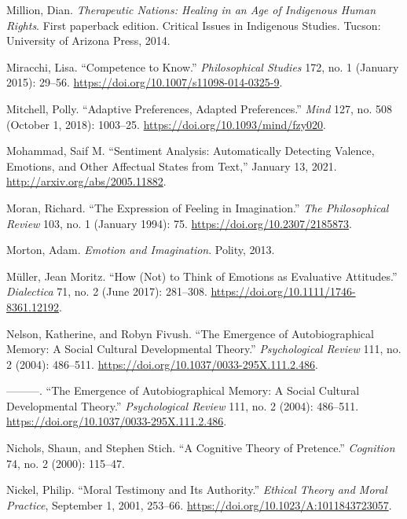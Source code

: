 \documentclass[phdthesis,12pt,final]{wuthesis}
\newlength{\cslhangindent}
\newenvironment{CSLReferences}[2] %
{\begin{list}{}{%
	\setlength{\itemindent}{0pt}
	\setlength{\leftmargin}{0pt}
	\setlength{\parsep}{0pt}
	\ifodd #1
	\setlength{\leftmargin}{\cslhangindent}
	\setlength{\itemindent}{-1\cslhangindent}
	\fi
	\setlength{\itemsep}{#2\baselineskip}}}
{\end{list}}
\theoremstyle{definition}
\theoremstyle{definition}
\theoremstyle{definition}
\theoremstyle{definition}
\theoremstyle{remark}
\begin{document}
\begin{CSLReferences}{1}{0}
Million, Dian. \emph{Therapeutic {Nations}: {Healing} in an {Age} of {Indigenous Human Rights}}. First paperback edition. Critical {Issues} in {Indigenous Studies}. Tucson: University of Arizona Press, 2014.

Miracchi, Lisa. {``Competence to Know.''} \emph{Philosophical Studies} 172, no. 1 (January 2015): 29--56. \url{https://doi.org/10.1007/s11098-014-0325-9}.

Mitchell, Polly. {``Adaptive {Preferences}, {Adapted Preferences}.''} \emph{Mind} 127, no. 508 (October 1, 2018): 1003--25. \url{https://doi.org/10.1093/mind/fzy020}.

Mohammad, Saif M. {``Sentiment {Analysis}: {Automatically Detecting Valence}, {Emotions}, and {Other Affectual States} from {Text},''} January 13, 2021. \url{http://arxiv.org/abs/2005.11882}.

Moran, Richard. {``The {Expression} of {Feeling} in {Imagination}.''} \emph{The Philosophical Review} 103, no. 1 (January 1994): 75. \url{https://doi.org/10.2307/2185873}.

Morton, Adam. \emph{Emotion and {Imagination}}. Polity, 2013.

Müller, Jean Moritz. {``How ({Not}) to {Think} of {Emotions} as {Evaluative Attitudes}.''} \emph{Dialectica} 71, no. 2 (June 2017): 281--308. \url{https://doi.org/10.1111/1746-8361.12192}.

Nelson, Katherine, and Robyn Fivush. {``The {Emergence} of {Autobiographical Memory}: {A Social Cultural Developmental Theory}.''} \emph{Psychological Review} 111, no. 2 (2004): 486--511. \url{https://doi.org/10.1037/0033-295X.111.2.486}.

---------. {``The {Emergence} of {Autobiographical Memory}: {A Social Cultural Developmental Theory}.''} \emph{Psychological Review} 111, no. 2 (2004): 486--511. \url{https://doi.org/10.1037/0033-295X.111.2.486}.

Nichols, Shaun, and Stephen Stich. {``A {Cognitive Theory} of {Pretence}.''} \emph{Cognition} 74, no. 2 (2000): 115--47.

Nickel, Philip. {``Moral {Testimony} and Its {Authority}.''} \emph{Ethical Theory and Moral Practice}, September 1, 2001, 253--66. \url{https://doi.org/10.1023/A:1011843723057}.


\end{CSLReferences}
\end{document}
